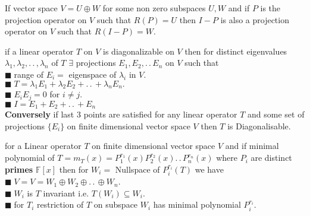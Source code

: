\documentclass[11pt]{extarticle}
\newcommand{\F}{\mathbb{F}}
\newcommand{\ck}{.\,.\,}
\newcommand{\tbx}[2][]{
	\begin{tcolorbox}[enhanced,breakable,size=small,colback=black!2!white,title={#1},arc is angular, arc=1.5mm,drop fuzzy shadow]
		#2
	\end{tcolorbox}
}
\newcommand{\yi}{\\$\blacksquare\;$}
\begin{document}
\begin{multicols}{2}
   	 \tbx{ If vector space $ V=U\oplus W$ for some non zero subspaces $ U,W $ and if $ P $ is the projection operator on $ V $ such that $ R(P)=U $ then $ I-P $ is also a projection operator on $ V $ such that $ R(I-P)=W .$   }
   	\tbx[Diagonalizability and Projections]{ if a linear operator $ T $ on $ V $  is diagonalizable on  $ V $ then for distinct eigenvalues $ \lambda_1,\lambda_2,\ck, \lambda_n$ of $ T $ $ \exists $ projections $ E_1,E_2,\ck E_n $ on $ V $ such that
   	\yi range of $ E_i = $ eigenspace of $ \lambda_i $ in $ V $.
   	\yi $ T=\lambda_1 E_1+\lambda_2 E_2 +\ck +\lambda_n E_n .$
   	\yi $ E_iE_j=0 $ for $ i\neq j $.
   	\yi $ I=E_1+E_2+\ck +E_n $ \\
   	  \textbf{Conversely} if last 3 points are satisfied for any linear operator $ T $ and some set of projections $ \{E_i\} $ on finite dimensional vector space $ V $ then $ T $ is Diagonalisable.}
   	  \tbx[Primary Decomposition Theorem]{ for a Linear operator $ T $ on finite dimensional vector space $ V $ and if minimal polynomial of $ T =m_T(x)=P_1^{r_1}(x)P_2^{r_2}(x)\ck P_n^{r_n}(x)$ where $ P_i $ are distinct \textbf{primes} $ \F[x] $ then for $ W_i = $ Nullspace of $ P_i^{r_i}(T) $ we have
   	  \yi $ V=   V= W_1\oplus W_2 \oplus \ck \oplus W_n$. 
   	  \yi $ W_i $ is $ T $ invariant i.e. $ T(W_i)\subseteq W_i. $ 
   	  \yi for $ T_i $ restriction of $ T $ on subspace $ W_i $ has minimal polynomial $ P_i^{r_i} $.}

\end{multicols}
\end{document}
